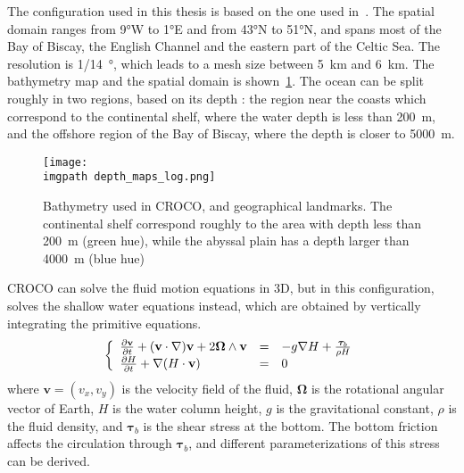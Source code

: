 \documentclass[../../Main_ManuscritThese.tex]{subfiles}
\newcommand{\CROCO}{CROCO}
\newcommand\imgpath{/home/victor/acadwriting/Manuscrit/Text/Chapter5/img/}
\begin{document}
The configuration used in this thesis is based on the one used
in~\cite{boutet_estimation_2015}. The spatial domain ranges from
\ang{9}W to \ang{1}E and from \ang{43}N to \ang{51}N, and spans most
of the Bay of Biscay, the English Channel and the eastern part of the
Celtic Sea.  The resolution is \SI{1/14}{\degree}, which leads to a
mesh size between \SI{5}{\kilo\metre} and \SI{6}{\kilo\metre}. The
bathymetry map and the spatial domain is
shown~\cref{fig:depth_maps}. The ocean can be split roughly in two
regions, based on its depth : the region near the coasts which
correspond to the continental shelf, where the water depth is less
than \SI{200}{\meter}, and the offshore region of the Bay of Biscay,
where the depth is closer to \SI{5000}{\meter}.
\begin{figure}[ht]
  \centering
  \texttt{[image: \\imgpath depth\_maps\_log.png]}
  \caption{\label{fig:depth_maps} Bathymetry used in \CROCO, and
    geographical landmarks. The continental shelf correspond roughly
    to the area with depth less than \SI{200}{\meter} (green hue),
    while the abyssal plain has a depth larger than \SI{4000}{\meter}
    (blue hue)}
\end{figure}


\CROCO{} can solve the fluid motion equations in 3D, but in this
configuration, solves the shallow water equations instead, which are
obtained by vertically integrating the primitive equations.
\begin{align}
  \left\{
  \begin{array}{lll}
    \frac{\partial \mathbf{v}}{\partial t} + (\mathbf{v} \cdot \nabla )\mathbf{v} + 2 \bm{\Omega} \wedge \mathbf{v} &=& -g\nabla H + \frac{\bm{\tau}_b}{\rho H} \\
    \frac{\partial H}{\partial t} + \nabla (H \cdot \mathbf{v}) &=& 0
  \end{array}
                                                   \right.
\end{align}
where $\mathbf{v} = (v_x,v_y)$ is the velocity field of the fluid,
$\bm{\Omega}$ is the rotational angular vector of Earth, $H$ is the
water column height, $g$ is the gravitational constant, $\rho$ is the
fluid density, and $\bm{\tau}_b$ is the shear stress at the
bottom. The bottom friction affects the circulation through
$\bm{\tau}_b$, and different parameterizations of this stress can be
derived.
\end{document}
